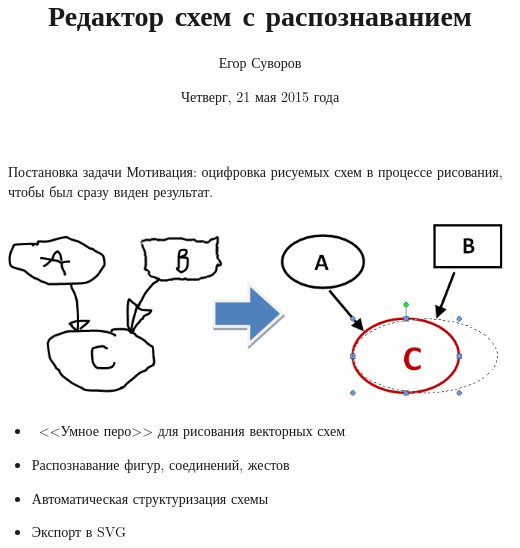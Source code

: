 \documentclass[utf8,xcolor=table]{beamer}
\title{Редактор схем с распознаванием}
\author{Егор Суворов}
\institute[CSCenter]{Практика, весна-осень 2015\\Куратор: Евгений Линский}
\date[21.05.2015]{Четверг, 21 мая 2015 года}
\begin{document}
\begin{frame}
\titlepage
\end{frame}

\begin{frame}[t]{Постановка задачи}
  Мотивация: оцифровка рисуемых схем в процессе рисования,
  чтобы был сразу виден результат.

  \includegraphics[width=\textwidth]{problem}
  \begin{itemize}
  \item~<<Умное перо>> для рисования векторных схем
  \item Распознавание фигур, соединений, жестов
  \item Автоматическая структуризация схемы
  \item Экспорт в SVG
  \end{itemize}
\end{frame}
\end{document}
